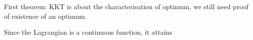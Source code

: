 First theorem: KKT is about the characterisation of optimum, we still need proof of existence of an optimum. 

Since the Lagrangian is a continuous function, it attains 